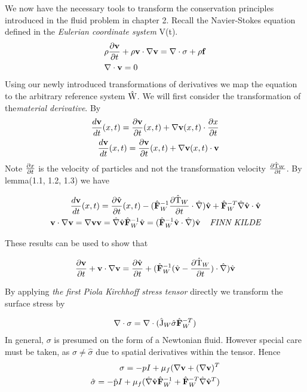 We now have the necessary tools to transform the conservation principles introduced in the fluid problem in chapter 2. Recall the Navier-Stokes equation defined in the \textit{Eulerian coordinate system} V(t).
\begin{align*}
&\rho \frac{\partial \mathbf{v}}{\partial t} + \rho \mathbf{v} \cdot \nabla \mathbf{v} =
\nabla \cdot \sigma + \rho \mathbf{f} \\
&\nabla \cdot \mathbf{v} = 0
\end{align*}
Using our newly introduced transformations of derivatives we map the equation to the arbitrary reference system $\text{\^{W}}$. We will first consider the transformation of the\textit{material derivative}. By 
\begin{align*}
\frac{d \mathbf{v}}{dt}(x,t) = \frac{\partial \mathbf{v}}{\partial t}(x,t) + \nabla \mathbf{v}(x,t) \cdot \frac{\partial x}{\partial t} \\
\frac{d \mathbf{v}}{dt}(x,t) = \frac{\partial \mathbf{v}}{\partial t}(x,t) + \nabla \mathbf{v}(x,t) \cdot \mathbf{v}
\end{align*}
Note $\frac{\partial x}{\partial t}$ is the velocity of particles and not the transformation velocity $\frac{\partial \text{\^{T}}_W}{\partial t}$. By lemma(1.1, 1.2, 1.3) we have  

\begin{align*}
\frac{d \mathbf{v}}{dt}(x,t) = 
\pder{\hat{v}}{t}(x,t) - (\hat{F}_W^{-1}\pder{\ha{T}_W}{t} \cdot \hat{\nabla})\hat{v}
+ \hat{F}_W^{-T}\hat{\nabla}\hat{v} \cdot \hat{v} \\
\mathbf{v} \cdot \nabla \mathbf{v} = \nabla \mathbf{v} \mathbf{v} = 
\hat{\nabla}\hat{v}\hat{F}_W^{-1}\hat{v} = (\hat{F}_W^{-1}\hat{v} \cdot \hat{\nabla})\hat{v} \hspace{4mm} \textit{FINN KILDE}
\end{align*}

These results can be used to show that

\begin{align*}
\pder{\mathbf{v}}{t} + \mathbf{v} \cdot \nabla \mathbf{v} =
\pder{\hat{v}}{t} + (\hat{F}_W^{-1}(\hat{v} - \pder{\ha{T}_W}{t}) \cdot \hat{\nabla}) \hat{v}
\end{align*}

By applying \textit{the first Piola Kirchhoff stress tensor} directly we transform the surface stress by 

\begin{align*}
\nabla \cdot \sigma = \nabla \cdot (\ha{J}_W \hat{\sigma}\hat{F}_W^{-T})
\end{align*}
In general, $\sigma$ is presumed on the form of a Newtonian fluid.
However special care must be taken, as $\sigma \neq \hat{\sigma}$ due to spatial derivatives within the tensor. Hence 
\begin{align*}
\sigma = -p I + \mu_f(\nabla \mathbf{v} + (\nabla \mathbf{v})^T \\
\hat{\sigma} = -\ha{p} I + \mu_f(\hat{\nabla}\hat{v}\hat{F}_W^{-1} +\hat{F}_W^{-T}\hat{\nabla}\hat{v}^T )
\end{align*} 

